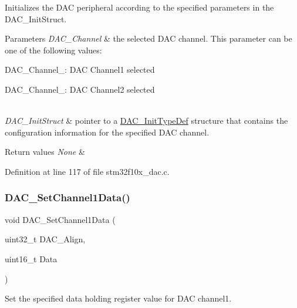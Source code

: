 Initializes the D\+AC peripheral according to the specified parameters in the D\+A\+C\+\_\+\+Init\+Struct. 


\begin{DoxyParams}{Parameters}
{\em D\+A\+C\+\_\+\+Channel} & the selected D\+AC channel. This parameter can be one of the following values\+: \begin{DoxyItemize}
\item D\+A\+C\+\_\+\+Channel\+\_\+: D\+AC Channel1 selected \item D\+A\+C\+\_\+\+Channel\+\_\+: D\+AC Channel2 selected \end{DoxyItemize}
\\
\hline
{\em D\+A\+C\+\_\+\+Init\+Struct} & pointer to a \hyperlink{struct_d_a_c___init_type_def}{D\+A\+C\+\_\+\+Init\+Type\+Def} structure that contains the configuration information for the specified D\+AC channel. \\
\hline
\end{DoxyParams}

\begin{DoxyRetVals}{Return values}
{\em None} & \\
\hline
\end{DoxyRetVals}


Definition at line 117 of file stm32f10x\+\_\+dac.\+c.

\mbox{\label{group___d_a_c___exported___functions_gad06b4230d2b17d1d13f41dce4c782461}} 
\subsubsection{\texorpdfstring{D\+A\+C\+\_\+\+Set\+Channel1\+Data()}{DAC\_SetChannel1Data()}}
{\footnotesize\ttfamily void D\+A\+C\+\_\+\+Set\+Channel1\+Data (\begin{DoxyParamCaption}\item[{uint32\+\_\+t}]{D\+A\+C\+\_\+\+Align,  }\item[{uint16\+\_\+t}]{Data }\end{DoxyParamCaption})}



Set the specified data holding register value for D\+AC channel1. 


